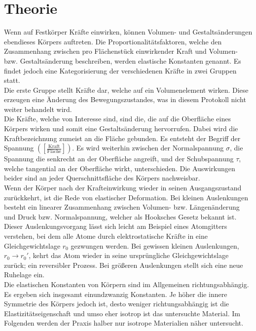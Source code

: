 \section{Theorie}
\label{sec:Theorie}
Wenn auf Festkörper Kräfte einwirken, können Volumen- und Gestaltsänderungen ebendieses Körpers auftreten.
Die Proportionalitätsfaktoren, welche den Zusammenhang zwischen pro Flächenstück einwirkender Kraft und Volumen- bzw. Gestaltsänderung beschreiben, werden elastische Konstanten genannt.
Es findet jedoch eine Kategorisierung der verschiedenen Kräfte in zwei Gruppen statt.\\
Die erste Gruppe stellt Kräfte dar, welche auf ein Volumenelement wirken.
Diese erzeugen eine Änderung des Bewegungszustandes, was in diesem Protokoll nicht weiter behandelt wird.\\
Die Kräfte, welche von Interesse sind, sind die, die auf die Oberfläche eines Körpers wirken und somit eine Gestaltsänderung hervorrufen.
Dabei wird die Kraftbezeichnung zumeist an die Fläche gebunden.
Es entsteht der Begriff der Spannung $([\frac{\text{Kraft}}{\text{Fläche}}])$.
Es wird weiterhin zwischen der Normalspannung $\sigma$, die Spannung die senkrecht an der Oberfläche angreift, und der Schubspannung $\tau$, welche tangential an der Oberfläche wirkt, unterschieden.
Die Auswirkungen beider sind an jeder Querschnittsfläche des Körpers nachweisbar.\\
Wenn der Körper nach der Krafteinwirkung wieder in seinen Ausgangszustand zurückkehrt, ist die Rede von elastischer Deformation.
Bei kleinen Auslenkungen besteht ein linearer Zusammenhang zwischen Volumen- bzw. Längenänderung und Druck bzw. Normalspannung, welcher als Hooksches Gesetz bekannt ist.
Dieser Auslenkungsvorgang lässt sich leicht am Beispiel eines Atomgitters verstehen, bei dem alle Atome durch elektrostatische Kräfte in eine Gleichgewichtslage $r_0$ gezwungen werden.
Bei gewissen kleinen Auslenkungen, $r_0 \rightarrow r_0'$, kehrt das Atom wieder in seine ursprüngliche Gleichgewichtslage zurück; ein reversibler Prozess.
Bei größeren Auslenkungen stellt sich eine neue Ruhelage ein.\\
Die elastischen Konstanten von Körpern sind im Allgemeinen richtungsabhängig.
Es ergeben sich insgesamt einundzwanzig Konstanten.
Je höher die innere Symmetrie des Körpers jedoch ist, desto weniger richtungsabhängig ist die Elastizitätseigenschaft und umso eher isotrop ist das untersuchte Material.
Im Folgenden werden der Praxis halber nur isotrope Materialien näher untersucht.\\
